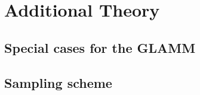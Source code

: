 \chapter{Additional Theory} \label{appA:additional}

\section{Special cases for the GLAMM}



\section{Sampling scheme}